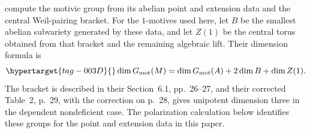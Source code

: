 \begin{remark}
\hypertarget{tag-IA11}{}\label{I:motivic-dimension-input}
\citet[Construction~3.4, p.~12, and Lemma~3.5, p.~13, arXiv v2]{bertolin2022} compute the motivic
group from its abelian point and extension data and the central
Weil-pairing bracket. For the $1$-motives used here, let $B$ be the
smallest abelian subvariety generated by these data, and let $Z(1)$
be the central torus obtained from that bracket and the remaining
algebraic lift. Their dimension formula is
\begin{equation}\hypertarget{tag-003D}{}\label{ari:eq:cp-MTdim}
 \dim G_{\mathrm{mot}}(M)
 =\dim G_{\mathrm{mot}}(A)+2\dim B+\dim Z(1).
\end{equation}
The bracket is described in their Section~6.1, pp.~26--27, and
their corrected Table~2, p.~29, with the correction on p.~28, gives unipotent dimension
three in the dependent nondeficient case. The polarization calculation below identifies these groups
for the point and extension data in this paper.
\end{remark}